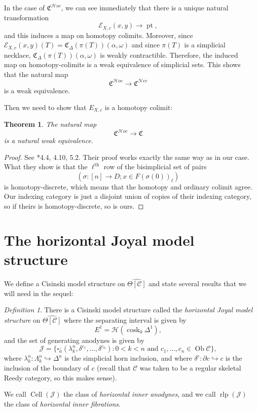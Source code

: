 \documentclass{amsart}
\numberwithin{equation}{section}
\theoremstyle{plain}   %
\newtheorem{thm}[subsection]{Theorem}
\theoremstyle{remark}
\newtheorem{defn}[subsection]{Definition}
\theoremstyle{plain}
\DeclareMathOperator{\Ob}{Ob}
\newcommand{\Nec}{\ensuremath{{\mathcal{N}ec}}}
\newcommand{\Hoc}{\ensuremath{{\mathcal{H}oc}}}
\newcommand{\C}{\ensuremath{\mathcal{C}}}
\DeclareMathOperator{\pt}{pt}
\newcommand{\cellset}{\ensuremath{\widehat{\Theta[\mathcal{C}]}}}
\begin{document}
In the case of \(\mathfrak{C}^\Hoc\), we can see immediately that there is a unique natural transformation \[\mathcal{E}_{X,c}(x,y)\to \pt,\] and this induces a map on homotopy colimits.  Moreover, since \(\mathcal{E}_{X,c}(x,y)(T)=\mathfrak{C}_\Delta(\pi(T))(\alpha,\omega)\) and since \(\pi(T)\) is a simplicial necklace,  \(\mathfrak{C}_\Delta(\pi(T))(\alpha,\omega)\) is weakly contractible. Therefore, the induced map on homotopy-colimits is a weak equivalence of simplicial sets.  This shows that the natural map \[\mathfrak{C}^\Hoc \to \mathfrak{C}^\Nec\] is a weak equivalence.

Then we need to show that \(E_{X,c}\) is a homotopy colimit:
\begin{thm}\label{necthm}
	The natural map \[\mathfrak{C}^\Hoc \to \mathfrak{C}\] is a natural weak equivalence.
\end{thm}
\begin{proof}
	See \cite{ds1}*{4.4, 4.10, 5.2}.  Their proof works exactly the same way as in our case.  What they show is that the \(\ell^\mathrm{th}\) row of the bisimplicial set of pairs 
	\[(\sigma:[n]\to D; x \in F(\sigma(0))_\ell)\]
	is homotopy-discrete, which means that the homotopy and ordinary colimit agree.  Our indexing category is just a disjoint union of copies of their indexing category, so if theirs is homotopy-discrete, so is ours.
\end{proof}

\section{The horizontal Joyal model structure}
We define a Cisinski model structure on \(\cellset\) and state several results that we will need in the sequel:

\begin{defn}
	There is a Cisinski model structure called the \emph{horizontal Joyal model structure} on \(\cellset\) where the separating interval is given by 
	\[E^1=\mathscr{H}(\operatorname{cosk}_0 \Delta^1),\]
	and the set of generating anodynes is given by
	\[\mathscr{J}=\{\square_n^\lrcorner(\lambda^n_k,\delta^{c_1},\dots,\delta^{c_n}) : 0<k<n \text{ and } c_1,\dots,c_n \in \Ob \C\},\]
	where \(\lambda^n_k:\Lambda^n_k\hookrightarrow \Delta^n\) is the simplicial horn inclusion, and where \(\delta^c:\partial c \hookrightarrow c\) is the inclusion of the boundary of \(c\) (recall that \(\C\) was taken to be a regular skeletal Reedy category, so this makes sense).

	We call \(\operatorname{Cell}(\mathscr{J})\) the class of \emph{horizontal inner anodynes}, and we call \(\operatorname{rlp}(\mathscr{J})\) the class of \emph{horizontal inner fibrations}.
\end{defn}
\end{document}
